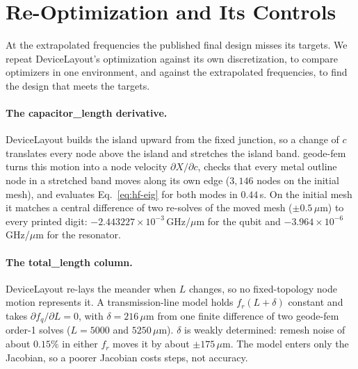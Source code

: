 \documentclass{anvil-paper}
\begin{document}
\section{Re-Optimization and Its Controls}
\label{sec:reopt}

At the extrapolated frequencies the published final design misses its
targets. We repeat DeviceLayout's optimization against its own
discretization, to compare optimizers in one environment, and against the
extrapolated frequencies, to find the design that meets the targets.

\paragraph{The capacitor\_length derivative.}
DeviceLayout builds the island upward from the fixed junction, so a change
of $c$ translates every node above the island and stretches the island
band. geode-fem turns this motion into a node velocity
$\partial X/\partial c$, checks that every metal outline node in a
stretched band moves along its own edge ($3{,}146$ nodes on the initial
mesh), and evaluates Eq.~\eqref{eq:hf-eig} for both modes in $0.44$\,s.
On the initial mesh it matches a central
difference of two re-solves of the moved mesh ($\pm0.5\,\mu$m) to every
printed digit: $-2.443227\times10^{-3}$\,GHz/$\mu$m for the qubit and
$-3.964\times10^{-6}$\,GHz/$\mu$m for the resonator.

\paragraph{The total\_length column.}
DeviceLayout re-lays the meander when $L$ changes, so no fixed-topology
node motion represents it. A transmission-line model holds $f_r(L+\delta)$
constant and takes $\partial f_q/\partial L = 0$, with $\delta =
216\,\mu$m from one finite difference of two geode-fem order-1 solves
($L = 5000$ and $5250\,\mu$m). $\delta$ is weakly determined: remesh noise
of about $0.15\%$ in either $f_r$ moves it by about $\pm175\,\mu$m. The
model enters only the Jacobian, so a poorer Jacobian costs steps, not
accuracy.
\end{document}
